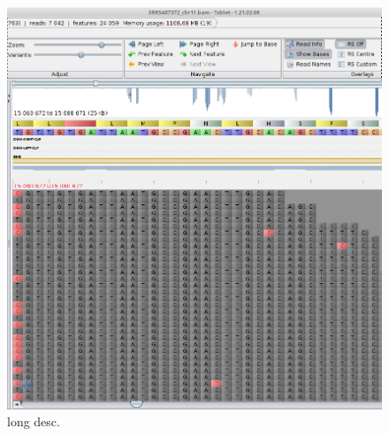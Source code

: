 \begin{figure}
\begin{center}

\includegraphics[width=1\textwidth]{misc/SRR5487372_chr11_15068672T_C.png}
\caption[caption] {long desc.}

\end{center}
\end{figure}


